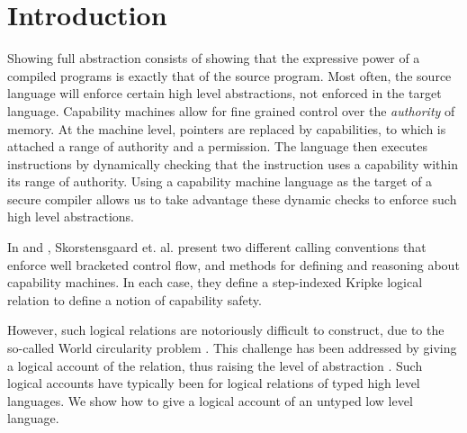 \documentclass[sigplan,review]{acmart}\settopmatter{printfolios=true,printccs=false,printacmref=false}
\begin{document}




\maketitle


\section{Introduction}

Showing full abstraction consists of showing that the expressive power of a compiled programs is exactly that of the source program. Most often, the source language will enforce certain high level abstractions, not enforced in the target language. Capability machines allow for fine grained control over the \textit{authority} of memory. At the machine level, pointers are replaced by capabilities, to which is attached a range of authority and a permission. The language then executes instructions by dynamically checking that the instruction uses a capability within its range of authority. Using a capability machine language as the target of a secure compiler allows us to take advantage these dynamic checks to enforce such high level abstractions. 

In \cite{skorstengaardESOP18} and \cite{SkorstengaardPOPL19}, Skorstensgaard et. al. present two different calling conventions that enforce well bracketed control flow, and methods for defining and reasoning about capability machines. In each case, they define a step-indexed Kripke logical relation to define a notion of capability safety. 

However, such logical relations are notoriously difficult to construct, due to the so-called World circularity problem \cite{Ahmed2004SemanticsOT}. This challenge has been addressed by giving a logical account of the relation, thus raising the level of abstraction 
\cite{Krogh-Jespersen2017} \cite{dreyer_neis_birkedal_2012}. Such logical accounts have typically been for logical relations of typed high level languages. We show how to give a logical account of an untyped low level language. 
\end{document}
